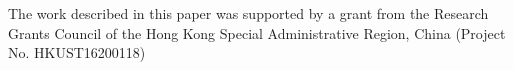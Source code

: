 \documentclass[acmsmall,screen]{acmart}
\begin{document}
%
 
\begin{acks}
The work described in this paper was supported by a grant from the Research Grants Council of the Hong Kong Special Administrative Region, China (Project No. HKUST16200118)
\end{acks}



\end{document}
